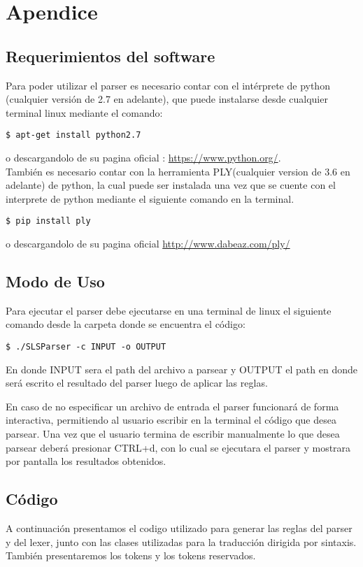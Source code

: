 \section{Apendice}

\subsection{Requerimientos del software}
Para poder utilizar el parser es necesario contar con el intérprete de python
(cualquier versión de 2.7 en adelante), que puede instalarse desde cualquier
terminal linux mediante el comando:

\begin{verbatim}
$ apt-get install python2.7
\end{verbatim}

o descargandolo de su pagina oficial : \url{https://www.python.org/}. \\
También es necesario contar con la herramienta PLY(cualquier version de 3.6 en
adelante) de python, la cual puede ser
instalada una vez que se cuente con el interprete de python mediante el siguiente comando en la terminal.
\begin{verbatim}
$ pip install ply
\end{verbatim}
o descargandolo de su pagina oficial \url{http://www.dabeaz.com/ply/}

\subsection{Modo de Uso}
Para ejecutar el parser debe ejecutarse en una terminal de linux el siguiente
comando desde la carpeta donde se encuentra el código:
\begin{verbatim}
$ ./SLSParser -c INPUT -o OUTPUT
\end{verbatim}


En donde INPUT sera el path del archivo a parsear y OUTPUT el path en donde
será escrito el resultado del parser luego de aplicar las reglas.

En caso de no
especificar un archivo de entrada el parser funcionará de forma interactiva,
permitiendo al usuario escribir en la terminal el código que desea parsear. Una
vez que el usuario termina de escribir manualmente lo que desea parsear deberá
presionar CTRL+d, con lo cual se ejecutara el parser y mostrara por pantalla
los resultados obtenidos.

\subsection{Código}
A continuación presentamos el codigo utilizado para generar las reglas del
parser y del lexer, junto con las clases utilizadas para
la traducción dirigida por sintaxis. También presentaremos los tokens y los
tokens reservados.
